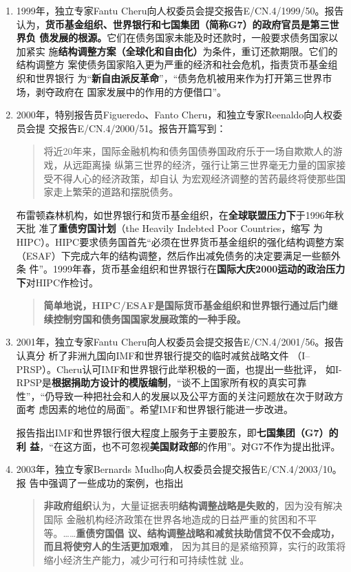 \begin{enumerate}
\item 1999年，独立专家Fantu Cheru向人权委员会提交报告E/CN.4/1999/50。报告
  认为，\textbf{货币基金组织、世界银行和七国集团（简称G7）的政府官员是第三世界负
    债发展的根源。}它们在债务国家未能及时还款时，一般要求债务国家以加紧实
  施\textbf{结构调整方案（全球化和自由化）}为条件，重订还款期限。它们的结构调整方
  案使债务国家陷入更为严重的经济和社会危机，指责货币基金组织和世界银行
  为“\textbf{新自由派反革命}”，“债务危机被用来作为打开第三世界市场，剥夺政府在
  国家发展中的作用的方便借口”。

\item 2000年，特别报告员Figueredo、Fanto Cheru，和独立专家Reenaldo向人权委员会提
  交报告E/CN.4/2000/51。报告开篇写到：
  \begin{quotation}
    将近20年来，国际金融机构和债务国债券国政府乐于一场自欺欺人的游戏，从远距离操
    纵第三世界的经济，强行让第三世界毫无力量的国家接受不得人心的经济政策，却自认
    为宏观经济调整的苦药最终将使那些国家走上繁荣的道路和摆脱债务。
  \end{quotation}

  布雷顿森林机构，如世界银行和货币基金组织，在\textbf{全球联盟压力下}于1996年秋天批
  准了\textbf{重债穷国计划}（the Heavily Indebted Poor Countries，缩写
  为HIPC）。HIPC要求债务国首先“必须在世界货币基金组织的强化结构调整方案
  （ESAF）下完成六年的结构调整，然后作出减免债务的决定要满足一些额外条
  件”。1999年春，货币基金组织和世界银行在\textbf{国际大庆2000运动的政治压力
    下}对HIPC作检讨。
  \begin{quotation}
    \textbf{简单地说，HIPC/ESAF是国际货币基金组织和世界银行通过后门继续控制穷国和债务国国家发展政策的一种手段。}
  \end{quotation}

\item 2001年，独立专家Fantu Cheru向人权委员会提交报告E/CN.4/2001/56。报告认真分
  析了非洲九国向IMF和世界银行提交的临时减贫战略文件
  （I--PRSP）。Cheru认可IMF和世界银行此举积极的一面，也提出一些批评，
  如I-RPSP是\textbf{根据捐助方设计的模版编制}，“谈不上国家所有权的真实可靠
  性”，“仍导致一种把社会和人的发展以及公平方面的关注问题放在次于财政方面考
  虑因素的地位的局面”。希望IMF和世界银行能进一步改进。

  报告指出IMF和世界银行很大程度上服务于主要股东，即\textbf{七国集团（G7）的利
    益}，“在这方面，也不可忽视\textbf{美国财政部}的作用”。对G7不作为提出批评。

\item 2003年，独立专家Bernards Mudho向人权委员会提交报告E/CN.4/2003/10。报
  告中强调了一些成功的案例，也指出
  \begin{quotation}
    \textbf{非政府组织}认为，大量证据表明\textbf{结构调整战略是失败的}，因为没有解决国际
    金融机构经济政策在世界各地造成的日益严重的贫困和不平等。……\textbf{重债穷国倡
      议、结构调整战略和减贫扶助信贷不仅不会成功，而且将使穷人的生活更加艰难}，
    因为其目的是紧缩预算，实行的政策将缩小经济生产能力，减少可行和可持续性就
    业。


\end{quotation}
\end{enumerate}
